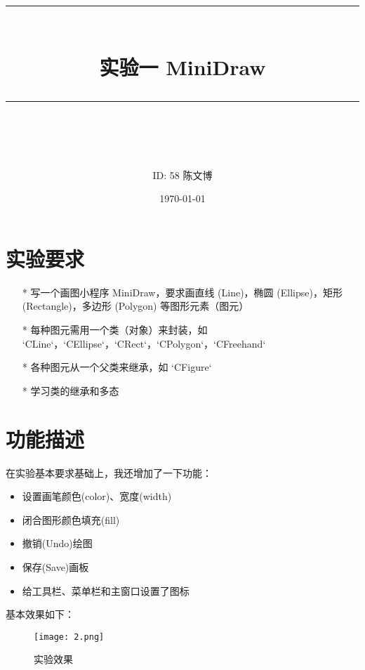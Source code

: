 \documentclass[14pt]{scrartcl} %
\title{	
	\normalfont\normalsize
	\rule{\linewidth}{0.5pt}\\ %
	\vspace{20pt} %
	{\huge 实验一	MiniDraw}\\ %
	\vspace{12pt} %
	\rule{\linewidth}{2pt}\\ %
	\vspace{12pt} %
}
\author{\LARGE ID: 58		陈文博} %
\date{\normalsize\today} %
\begin{document}
\maketitle %


\section{实验要求}


\begin{itemize}
	\item[*] 写一个画图小程序 MiniDraw，要求画直线 (Line)，椭圆 (Ellipse)，矩形 (Rectangle)，多边形 (Polygon) 等图形元素（图元）
	\item[*] 每种图元需用一个类（对象）来封装，如 `CLine`，`CEllipse`，`CRect`，`CPolygon`，`CFreehand` 
	\item[*] 各种图元从一个父类来继承，如 `CFigure` 
	\item[*] 学习类的继承和多态
\end{itemize}

\pagebreak
\section{功能描述}

在实验基本要求基础上，我还增加了一下功能：
\begin{itemize}
	\item 设置画笔颜色(color)、宽度(width)
	\item 闭合图形颜色填充(fill)
	\item 撤销(Undo)绘图
	\item 保存(Save)画板
	\item 给工具栏、菜单栏和主窗口设置了图标
\end{itemize}
基本效果如下：

\begin{figure}[h] %
	\centering
	\texttt{[image: 2.png]} %
	\caption{实验效果}
\end{figure}
\end{document}
